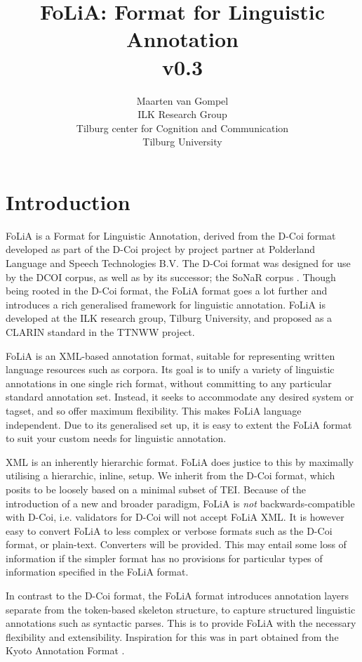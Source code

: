 \documentclass[a4paper,12pt]{report}
\title{FoLiA: Format for Linguistic Annotation \\ \small v0.3}
\author{Maarten van Gompel \\ ILK Research Group \\ Tilburg center for Cognition and Communication \\ Tilburg University }
\begin{document}
\sffamily

\maketitle
\tableofcontents


\chapter{Introduction}

FoLiA is a Format for Linguistic Annotation, derived from the D-Coi format\cite{DCOI} developed as part of the D-Coi project by project partner at Polderland Language and Speech Technologies B.V. The D-Coi format was designed for use by the DCOI corpus, as well as by its successor; the SoNaR corpus \cite{Oostdijk+08}. Though being rooted in the D-Coi format, the FoLiA format goes a lot further and introduces a rich generalised framework for linguistic annotation. FoLiA is developed at the ILK research group, Tilburg University, and proposed as a CLARIN standard in the TTNWW project.

FoLiA is an XML-based\cite{XML} annotation format, suitable for representing written language resources such as corpora. Its goal is to unify a variety of linguistic annotations in one single rich format, without committing to any particular standard annotation set. Instead, it seeks to accommodate any desired system or tagset, and so offer maximum flexibility. This makes FoLiA language independent. Due to its generalised set up, it is easy to extent the FoLiA format to suit your custom needs for linguistic annotation.

XML is an inherently hierarchic format. FoLiA does justice to this by maximally utilising a hierarchic, inline, setup. We inherit from the D-Coi format, which posits to be loosely based on a minimal subset of TEI\cite{TEI}. Because of the introduction of a new and broader paradigm, FoLiA is \emph{not} backwards-compatible with D-Coi, i.e. validators for D-Coi will not accept FoLiA XML. It is however easy to convert FoLiA to less complex or verbose formats such as the D-Coi format, or plain-text. Converters will be provided. This may entail some loss of information if the simpler format has no provisions for particular types of information specified in the FoLiA format. 


In contrast to the D-Coi format, the FoLiA format introduces annotation layers separate from the token-based skeleton structure, to capture structured linguistic annotations such as syntactic parses. This is to provide FoLiA with the necessary flexibility and extensibility. Inspiration for this was in part obtained from the Kyoto Annotation Format \cite{KYOTO}. 
\end{document}
